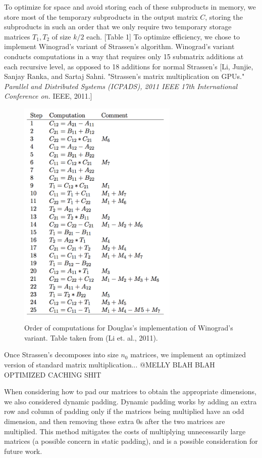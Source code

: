 \documentclass[a4paper]{article}
\begin{document}
To optimize for space and avoid storing each of these subproducts in memory, we store most of the temporary subproducts in the output matrix $C$, storing the subproducts in such an order that we only require two temporary storage matrices $T_1, T_2$ of size $k/2$ each. [Table 1] To optimize efficiency, we chose to implement Winograd's variant of Strassen's algorithm. Winograd's variant conducts computations in a way that requires only 15 submatrix additions at each recursive level, as opposed to 18 additions for normal Strassen's [Li, Junjie, Sanjay Ranka, and Sartaj Sahni. "Strassen's matrix multiplication on GPUs." \textit{Parallel and Distributed Systems (ICPADS), 2011 IEEE 17th International Conference on.} IEEE, 2011.]

\begin{figure}[h]
	\caption{Order of computations for Douglas's implementation of Winograd's variant. Table taken from (Li et. al., 2011).}
	\centering
		\includegraphics[width=3in]{computations.png}
\end{figure}

Once Strassen's decomposes into size $n_0$ matrices, we implement an optimized version of standard matrix multiplication... @MELLY BLAH BLAH OPTIMIZED CACHING SHIT

When considering how to pad our matrices to obtain the appropriate dimensions, we also considered dynamic padding. Dynamic padding works by adding an extra row and column of padding only if the matrices being multiplied have an odd dimension, and then removing these extra 0s after the two matrices are multiplied. This method mitigates the costs of multiplying unnecessarily large matrices (a possible concern in static padding), and is a possible consideration for future work.
\end{document}
